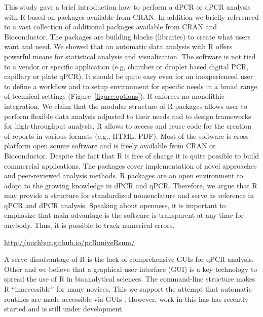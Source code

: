 This study gave a brief introduction how to perform a dPCR or qPCR analysis with 
R based on packages available from CRAN. In addition we briefly referenced to a 
vast collection of additional packages available from CRAN and Bioconductor. The 
packages are building blocks (libraries) to create what users want and need. We 
showed that an automatic data analysis with R offers powerful means for 
statistical analysis and visualization. The software is not tied to a vendor or 
specific application (e.g, chamber or droplet based digital PCR, capillary or 
plate qPCR). It should be quite easy even for an inexperienced user to define a 
workflow and to setup environment for specific needs in a broad range of 
technical settings (Figure~\ref{figure:options}). R enforces no monolithic 
integration. We claim that the modular structure of R packages allows user to 
perform flexible data analysis adjusted to their needs and to design frameworks 
for high-throughput analysis. R allows to access and reuse code for the creation 
of reports in various formats (e.g., HTML, PDF). Most of the software is 
cross-platform open source software and is freely available from CRAN or 
Bioconductor. Despite the fact that R is free of charge it is quite possible to 
build commercial applications. The packages cover implementation of novel 
approaches and peer-reviewed analysis methods. R packages are an open 
environment to adopt to the growing knowledge in dPCR and qPCR. Therefore, we 
argue that R may provide a structure for standardized nomenclature and serve as 
reference in qPCR and dPCR analysis. Speaking about openness, it is important to 
emphasize that main advantage is the software is transparent at any time for 
anybody. Thus, it is possible to track numerical errors. 

\url{http://michbur.github.io/pcRuniveRsum/}

A serve disadvantage of R is the lack of comprehensive GUIs for qPCR analysis. 
Other and we believe that a graphical user interface (GUI) is a key technology 
to spread the use of R in bioanalytical sciences. The command-line structure 
makes R ``inaccessible'' for many novices. This we support the attempt that 
automatic routines are made accessible via GUIs \citep{rodiger_rkward_2012}. 
However, work in this has has recently started and is still under development.

